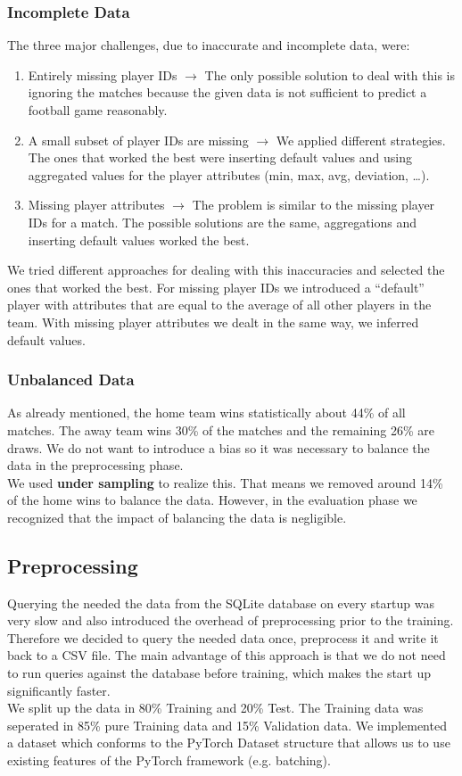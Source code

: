 \documentclass[a4paper]{article}
\begin{document}
\subsubsection{Incomplete Data}
The three major challenges, due to inaccurate and incomplete data, were:
\begin{enumerate}
  \item Entirely missing player IDs $\rightarrow$ The only possible solution to
  deal with this is ignoring the matches because the given data is not
  sufficient to predict a football game reasonably.
  \item A small subset of player IDs are missing $\rightarrow$ We applied
  different strategies. The ones that worked the best were inserting default
  values and using aggregated values for the player attributes (min, max, avg,
  deviation, \ldots).
  \item Missing player attributes $\rightarrow$ The problem is similar to the
  missing player IDs for a match. The possible solutions are the same,
  aggregations and inserting default values worked the best.
\end{enumerate}
We tried different approaches for dealing with this inaccuracies and selected
the ones that worked the best. For missing player IDs we introduced a
``default'' player with attributes that are equal to the average of all other
players in the team. With missing player attributes we dealt in the same way, we
inferred default values.

\subsubsection{Unbalanced Data}
As already mentioned, the home team wins statistically about 44\% of all
matches. The away team wins 30\% of the matches and the remaining 26\% are
draws. We do not want to introduce a bias so it was necessary to balance the
data in the preprocessing phase.
\\
We used \textbf{under sampling} to realize this. That means we removed around
14\% of the home wins to balance the data. However, in the evaluation phase we
recognized that the impact of balancing the data is negligible.

\subsection{Preprocessing}
Querying the needed the data from the SQLite database on every startup was very
slow and also introduced the overhead of preprocessing prior to the training.
Therefore we decided to query the needed data once, preprocess it and write it
back to a CSV file. The main advantage of this approach is that we do not need
to run queries against the database before training, which makes the start up
significantly faster.
\\
We split up the data in 80\% Training and 20\% Test. The Training data was
seperated in 85\% pure Training data and 15\% Validation data. We implemented a
dataset which conforms to the PyTorch Dataset structure that allows us to use
existing features of the PyTorch framework (e.g. batching).
\end{document}
